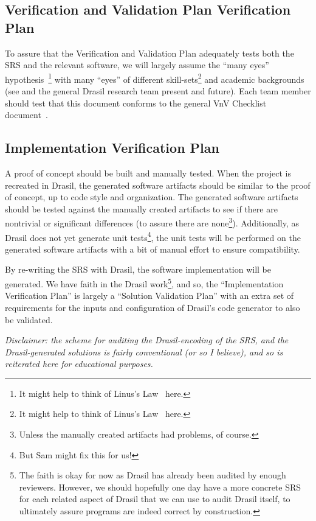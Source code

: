 \documentclass[12pt, titlepage]{article}
\begin{document}
\subsection{Verification and Validation Plan Verification Plan}

To assure that the Verification and Validation Plan adequately tests both the
SRS and the relevant software, we will largely assume the ``many eyes''
hypothesis~\cite{Caraco1980avian}\footnote{It might help to think of Linus's
    Law~\cite{LinussLawWiki} here.} with many ``eyes'' of different
skill-sets\footnote{It might help to think of Linus's Law~\cite{LinussLawWiki}
    here.} and academic backgrounds (see  and the general
Drasil research team present and future). Each team member should test that this
document conforms to the general VnV Checklist document~\cite{SmithCapTemplate}.

\subsection{Implementation Verification Plan}

A proof of concept should be built and manually tested. When the project is
recreated in Drasil, the generated software artifacts should be similar to the
proof of concept, up to code style and organization. The generated software
artifacts should be tested against the manually created artifacts to see if
there are nontrivial or significant differences (to assure there are
none\footnote{Unless the manually created artifacts had problems, of course.}).
Additionally, as Drasil does not yet generate unit tests\footnote{But Sam might
    fix this for us!}, the unit tests will be performed on the generated software
artifacts with a bit of manual effort to ensure compatibility.

By re-writing the SRS with Drasil, the software implementation will be
generated. We have faith in the Drasil work\footnote{The faith is okay for now
    as Drasil has already been audited by enough reviewers. However, we should
    hopefully one day have a more concrete SRS for each related aspect of Drasil
    that we can use to audit Drasil itself, to ultimately assure programs are indeed
    correct by construction.}, and so, the ``Implementation Verification Plan'' is
largely a ``Solution Validation Plan'' with an extra set of requirements for the
inputs and configuration of Drasil's code generator to also be validated.

\textit{Disclaimer: the scheme for auditing the Drasil-encoding of the SRS, and
    the Drasil-generated solutions is fairly conventional (or so I believe), and so
    is reiterated here for educational purposes.}
\end{document}
